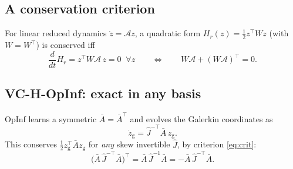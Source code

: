 \subsection{A conservation criterion}

For linear reduced dynamics $\dot z = \mathcal{A} z$, a quadratic form
$H_r(z) = \tfrac12 z^{\top} W z$ (with $W = W^{\top}$) is conserved iff
\begin{equation}
  \frac{d}{dt} H_r = z^{\top} W \mathcal{A}\, z = 0 \;\;\forall z
  \qquad\Longleftrightarrow\qquad
  W\mathcal{A} + (W\mathcal{A})^{\top} = 0 .
  \label{eq:crit}
\end{equation}

\subsection{VC-H-OpInf: exact in any basis}

OpInf learns a symmetric $\bar{A} = \bar{A}^{\top}$ and evolves the Galerkin
coordinates as
\begin{equation}
  \dot z_{\mathrm{g}} = \hat{J}^{-\top} \bar{A}\, z_{\mathrm{g}} .
  \label{eq:opinf}
\end{equation}
This conserves $\tfrac12 z_{\mathrm{g}}^{\top} \bar{A} z_{\mathrm{g}}$ for
\emph{any} skew invertible $\hat J$, by criterion \eqref{eq:crit}:
\begin{equation}
  \bigl(\bar{A}\,\hat{J}^{-\top}\bar{A}\bigr)^{\top}
  = \bar{A}\,\hat{J}^{-1}\bar{A}
  = -\bar{A}\,\hat{J}^{-\top}\bar{A} .
\end{equation}

